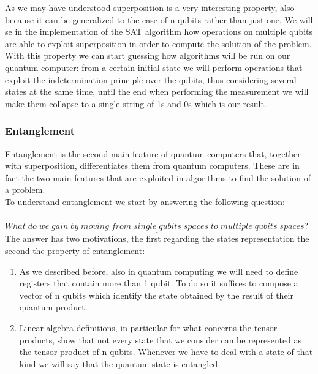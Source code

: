 \documentclass[english]{article}
\begin{document}
				As we may have understood superposition is a very interesting property, also because it can be generalized to the case of n qubits rather than just one. We will se in the implementation of the SAT algorithm how operations on multiple qubits are able to exploit superposition in order to compute the solution of the problem. With this property we can start guessing how algorithms will be run on our quantum computer: from a certain initial state we will perform operations that exploit the indetermination principle over the qubits, thus considering several states at the same time, until the end when performing the measurement we will make them collapse to a single string of 1s and 0s which is our result.
			
			\subsubsection{Entanglement}
			\label{sec:entanglement}
				Entanglement is the second main feature of quantum computers that, together with superposition, differentiates them from quantum computers. These are in fact the two main features that are exploited in algorithms to find the solution of a problem. \\
				
				To understand entanglement we start by answering the following question: \\ \\				
				$\underline{What \; do \; we \; gain \; by \; moving \; from \; single \; qubits \; spaces \; to \; multiple \; qubits \; spaces?}$ \\
				
				The answer has two motivations, the first regarding the states representation the second the property of entanglement:
				\begin{enumerate}[label=(\roman*)]
					\item As we described before, also in quantum computing we will need to define registers that contain more than 1 qubit. To do so it suffices to compose a vector of n qubits which identify the state obtained by the result of their quantum product.
					
					\item Linear algebra definitions, in particular for what concerns the tensor products, show that not every state that we consider can be represented as the tensor product of n-qubits. Whenever we have to deal with a state of that kind we will say that the quantum state is entangled.
				\end{enumerate}
			
\end{document}
